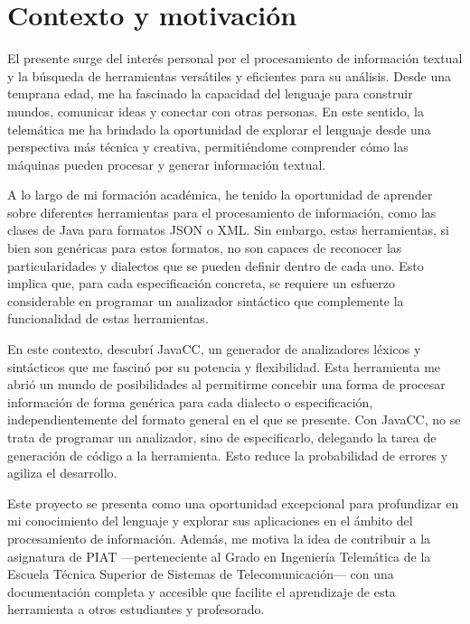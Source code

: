 \section{Contexto y motivación}

\noindent El presente \pfg surge del interés personal por el procesamiento de información textual y la búsqueda de herramientas versátiles y eficientes para su análisis. Desde una temprana edad, me ha fascinado la capacidad del lenguaje para construir mundos, comunicar ideas y conectar con otras personas. En este sentido, la telemática me ha brindado la oportunidad de explorar el lenguaje desde una perspectiva más técnica y creativa, permitiéndome comprender cómo las máquinas pueden procesar y generar información textual.

A lo largo de mi formación académica, he tenido la oportunidad de aprender sobre diferentes herramientas para el procesamiento de información, como las clases de Java para formatos JSON o XML. Sin embargo,
estas herramientas, si bien son genéricas para estos formatos, no son capaces de reconocer las particularidades y dialectos que se pueden definir dentro de cada uno. Esto implica que, para cada especificación concreta, se requiere un esfuerzo considerable en programar un analizador sintáctico que complemente la funcionalidad de estas herramientas.

En este contexto, descubrí JavaCC, un generador de analizadores léxicos y sintácticos que me fascinó por su potencia y flexibilidad\cite{javaccgithub}. Esta herramienta me abrió un mundo de posibilidades al permitirme concebir una forma de procesar información de forma genérica
para cada dialecto o especificación, independientemente del formato general en el que se presente. Con JavaCC, no se trata de programar un analizador, sino de especificarlo, delegando la tarea de generación de código a la herramienta. Esto reduce la probabilidad de errores y agiliza el desarrollo.

Este proyecto se presenta como una oportunidad excepcional para profundizar en mi conocimiento del lenguaje y explorar sus aplicaciones en el ámbito del procesamiento de información. Además, me motiva la idea de contribuir a la asignatura de PIAT ---perteneciente al Grado en Ingeniería Telemática de la Escuela Técnica Superior de Sistemas de Telecomunicación--- con una documentación completa y accesible que facilite el aprendizaje de esta herramienta a otros estudiantes y profesorado.

